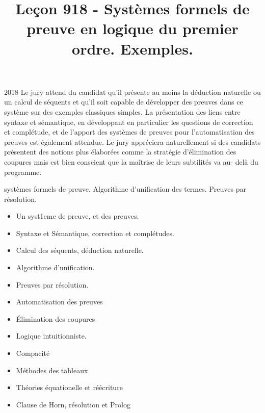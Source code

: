 \documentclass{agregfiche}
\title{Leçon 918 - Systèmes formels de preuve en logique du premier ordre. Exemples.}
\begin{document}
\maketitle

\secrapports
\begin{rapport}{2018}
	Le jury attend du candidat qu’il présente au moins la déduction naturelle ou un calcul de séquents
	et qu’il soit capable de développer des preuves dans ce système sur des exemples classiques simples.
	La présentation des liens entre syntaxe et sémantique, en développant en particulier les questions de
	correction et complétude, et de l’apport des systèmes de preuves pour l’automatisation des preuves est
	également attendue.
	Le jury appréciera naturellement si des candidats présentent des notions plus élaborées comme la
	stratégie d’élimination des coupures mais est bien conscient que la maîtrise de leurs subtilités va au-
	delà du programme.
\end{rapport}


systèmes formels de preuve. 
Algorithme d’unification des termes. Preuves par résolution.

\secindispensables

\begin{itemize}
	\item Un syst1eme de preuve, et des preuves.
	\item Syntaxe et Sémantique, correction et complétudes.
\end{itemize}

\secasavoir

\begin{itemize}
	\item Calcul des séquents, déduction naturelle.
	\item Algorithme d'unification.
	\item Preuves par résolution.
	\item Automatisation des preuves
\end{itemize}

\secidees

\begin{itemize}
	\item Élimination des coupures
	\item Logique intuitionniste.
	\item Compacité
	\item Méthodes des tableaux
	\item Théories équationelle et réécriture
	\item Clause de Horn, résolution et Prolog
\end{itemize}
\end{document}
